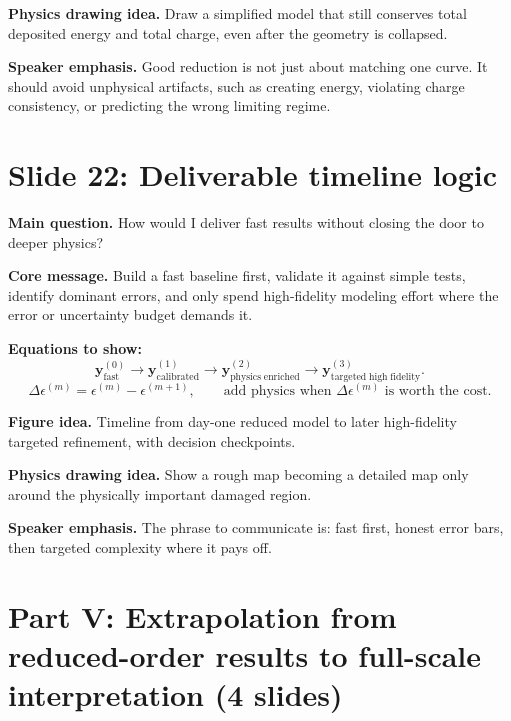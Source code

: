 \documentclass[11pt]{article}
\begin{document}
\textbf{Physics drawing idea.} Draw a simplified model that still conserves total deposited energy and total charge, even after the geometry is collapsed.

\textbf{Speaker emphasis.} Good reduction is not just about matching one curve. It should avoid unphysical artifacts, such as creating energy, violating charge consistency, or predicting the wrong limiting regime.

\section{Slide 22: Deliverable timeline logic}
\begin{physicsbox}
\textbf{Main question.} How would I deliver fast results without closing the door to deeper physics?
\end{physicsbox}

\textbf{Core message.} Build a fast baseline first, validate it against simple tests, identify dominant errors, and only spend high-fidelity modeling effort where the error or uncertainty budget demands it.

\textbf{Equations to show:}
\begin{equation*}
\mathbf{y}^{(0)}_{\mathrm{fast} }
\rightarrow
\mathbf{y}^{(1)}_{\mathrm{calibrated} }
\rightarrow
\mathbf{y}^{(2)}_{\mathrm{physics\;enriched} }
\rightarrow
\mathbf{y}^{(3)}_{\mathrm{targeted\;high\;fidelity} }.
\end{equation*}
\begin{equation*}
\Delta\epsilon^{(m)}=
\epsilon^{(m)}-\epsilon^{(m+1)},
\qquad
\text{add physics when }\Delta\epsilon^{(m)}\text{ is worth the cost}.
\end{equation*}

\textbf{Figure idea.} Timeline from day-one reduced model to later high-fidelity targeted refinement, with decision checkpoints.

\textbf{Physics drawing idea.} Show a rough map becoming a detailed map only around the physically important damaged region.

\textbf{Speaker emphasis.} The phrase to communicate is: fast first, honest error bars, then targeted complexity where it pays off.

\section{Part V: Extrapolation from reduced-order results to full-scale interpretation (4 slides)}
\end{document}
